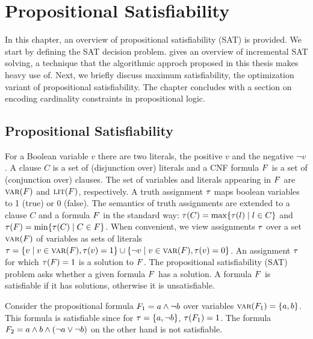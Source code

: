 \chapter{Propositional Satisfiability\label{chap:satisfiability}}

In this chapter, an overview of propositional satisfiability (SAT) is provided.
We start by defining the SAT decision problem.
 gives an overview of incremental SAT solving, a technique that the algorithmic approch proposed in this thesis makes heavy use of.
Next, we briefly discuss maximum satisfiability, the optimization variant of propositional satisfiability.
The chapter concludes with a section on encoding cardinality constraints in propositional logic.

\section{Propositional Satisfiability\label{sec:sat}}

For a Boolean variable $v$ there are two literals, the positive $v$ and the negative $\lnot v$. 
A clause $C$ is a set of (disjunction over) literals and a CNF formula $F$ is a set of (conjunction over) clauses.
The set of variables and literals appearing in $F$ are $\textsc{var}(F)$ and $\textsc{lit}(F)$, respectively.  
A truth assignment $\tau$ maps boolean variables to 1 (true) or 0 (false).
The semantics of truth assignments are extended to a clause $C$ and a formula $F$ in the standard way: $\tau(C) = \max\{ \tau(l) \mid l \in C\}$ and $\tau(F) = \min\{\tau(C) \mid C \in F\}$.
When convenient, we view assignments $\tau$ over a set $\textsc{var}(F)$ of variables as sets of literals $\tau = \{ v \mid v \in \textsc{var}(F),  \tau(v) = 1\} \cup \{ \lnot v \mid v \in \textsc{var}(F), \tau(v) = 0\}$.
An assignment $\tau$ for which $\tau(F) = 1$ is a solution to $F$.
The propositional satisfiability (SAT) problem asks whether a given formula $F$ has a solution.
A formula $F$ is satisfiable if it has solutions, otherwise it is unsatisfiable.

\begin{example}
  Consider the propositional formula $F_1 = a \land \lnot b$ over variables $\textsc{var}(F_1) = \{a,b\}$.
  This formula is satisfiable since for $\tau=\{a,\lnot b\}$, $\tau(F_1)=1$.
  The formula $F_2 = a \land b \land (\lnot a \lor \lnot b)$ on the other hand is not satisfiable.
\end{example}

